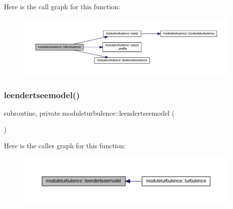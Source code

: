 Here is the call graph for this function\+:\nopagebreak
\begin{figure}[H]
\begin{center}
\leavevmode
\includegraphics[width=350pt]{namespacemoduleturbulence_a16fdef89832180a7e41d6bd450c05746_cgraph}
\end{center}
\end{figure}
\mbox{\label{namespacemoduleturbulence_aaab5a3be952e034c14a581ba00fb2d22}} 
\subsubsection{\texorpdfstring{leendertseemodel()}{leendertseemodel()}}
{\footnotesize\ttfamily subroutine, private moduleturbulence\+::leendertseemodel (\begin{DoxyParamCaption}{ }\end{DoxyParamCaption})\hspace{0.3cm}{\ttfamily [private]}}

Here is the caller graph for this function\+:\nopagebreak
\begin{figure}[H]
\begin{center}
\leavevmode
\includegraphics[width=350pt]{namespacemoduleturbulence_aaab5a3be952e034c14a581ba00fb2d22_icgraph}
\end{center}
\end{figure}
\mbox{\label{namespacemoduleturbulence_a36b249a1813247cecf28481893bc0ea2}} 
